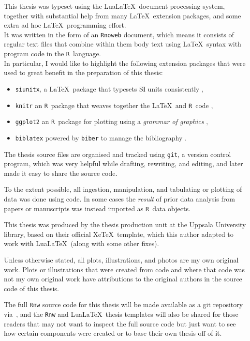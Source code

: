\documentclass[webedition,openright,titles,swedish,english]{LuaUUThesis}\usepackage[]{graphicx}\usepackage[]{xcolor}
\newcommand{\R}{\texttt{R}}
\newcommand{\XeTeX}{\mbox{Xe\TeX}}
\newcommand{\LuaLaTeX}{\mbox{Lua\LaTeX}}
\newcommand{\via}{via}
\begin{document}
This thesis was typeset using the \LuaLaTeX\ document processing system,
together with substantial help from many \LaTeX\ extension packages, and
some extra ad hoc \LaTeX\ programming effort.\\
It was written in the form of an \texttt{Rnoweb} document, which
means it consists of regular text files that combine within them body text
using \LaTeX\ syntax with program code in the \R\ language.\\
In particular, I would like to highlight the following extension packages
that were used to great benefit in the preparation of this thesis:
\begin{itemize}
\item \texttt{siunitx}, a \LaTeX\ package that typesets SI units consistently \cite{Wright2023},
\item \texttt{knitr} an \R\ package that weaves together the \LaTeX\ and \R\ code \cite{Xie2015},
\item \texttt{ggplot2} an \R\ package for plotting using a \emph{grammar of graphics} \cite{Wickham2016},
\item \texttt{biblatex} powered by \texttt{biber} to manage the bibliography \cite{Kime2023,Kime2022}.
\end{itemize}


The thesis source files are organised and tracked using \texttt{git},
a version control program, which was very helpful while drafting, rewriting, and editing,
and later made it easy to share the source code.

To the extent possible, all ingestion, manipulation, and tabulating
or plotting of data was done using code.
In some cases the \emph{result} of prior data analysis from papers or manuscripts
was instead imported as \R\ data objects.

This thesis was produced by the thesis production unit at the Uppsala University library,
based on their official \XeTeX\ template, which this author adapted to work
with \LuaLaTeX\ (along with some other fixes).

Unless otherwise stated, all plots, illustrations, and photos are my
own original work.
Plots or illustrations that were created from code and where that code
was not my own original work have attributions to the original authors
in the source code of this thesis.

The full \texttt{Rnw} source code for this thesis will be made available
as a git repository \via\ ,
and the \texttt{Rnw} and \LuaLaTeX\ thesis templates will also be shared
for those readers that may not want to inspect the full source code
but just want to see how certain components were created or to base their own
thesis off of it.
\end{document}
